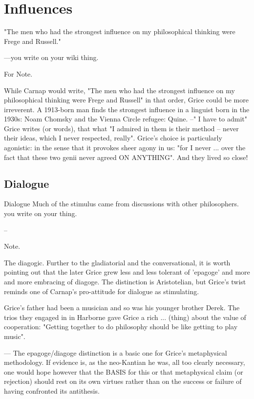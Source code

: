 \documentclass[10pt,titlepage]{book}
\begin{document}
{\section{Influences}

"The men who had the strongest influence on my philosophical  thinking were Frege and Russell." 
 
---you write on your wiki thing.
 
For Note.

While Carnap would write, "The men who had the strongest  influence on my 
philosophical thinking were Frege and Russell" in that order,  Grice could be 
more irreverent. A 1913-born man finds the strongest influence in  a 
linguist born in the 1930s: Noam Chomsky and the Vienna Circle refugee: Quine.  --"
I have to admit" Grice writes (or words), that what "I admired in them is  
their method -- never their ideas, which I never respected, really". Grice's 
 choice is particularly agonistic: in the sense that it provokes sheer 
agony in  us: "for I never ... over the fact that these two genii never agreed 
ON  ANYTHING".
And they lived so close!
 
\subsection{Dialogue}

Dialogue
Much of the stimulus came from discussions with other  philosophers.
you write on your thing.
 
--
 
Note.

The diagogic. Further to the gladiatorial and the conversational, it is  
worth pointing out that the later Grice grew less and less tolerant of 
'epagoge'  and more and more embracing of diagoge. The distinction is Aristotelian, 
but  Grice's twist reminds one of Carnap's pro-attitude for dialogue as  
stimulating.
 
Grice's father had been a musician and so was his younger brother Derek.  
The trios they engaged in in Harborne gave Grice a rich ... (thing) about the 
 value of cooperation: "Getting together to do philosophy should be like 
getting  to play music".
 
---
The epagoge/diagoge distinction is a basic one for Grice's metaphysical  
methodology. If evidence is, as the neo-Kantian he was, all too clearly  
necessary, one would hope however that the BASIS for this or that metaphysical  
claim (or rejection) should rest on its own virtues rather than on the 
success  or failure of having confronted its antithesis.
 
}
\end{document}
